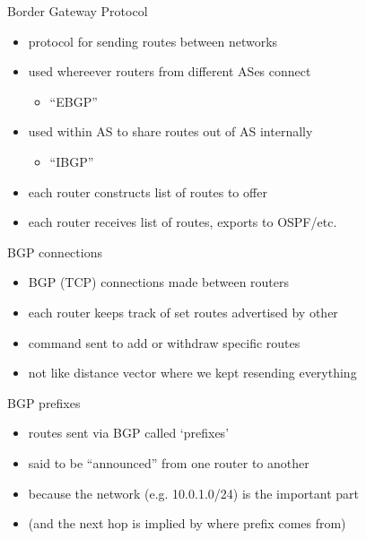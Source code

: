 \begin{frame}{Border Gateway Protocol}
    \begin{itemize}
    \item protocol for sending routes between networks
    \item used whereever routers from different ASes connect
        \begin{itemize}
        \item ``EBGP''
        \end{itemize}
    \item used within AS to share routes out of AS internally
        \begin{itemize}
        \item ``IBGP''
        \end{itemize}
    \vspace{.5cm}
    \item each router constructs list of routes to offer
    \item each router receives list of routes, exports to OSPF/etc.
    \end{itemize}
\end{frame}

\begin{frame}{BGP connections}
    \begin{itemize}
    \item BGP (TCP) connections made between routers
    \vspace{.5cm}
    \item each router keeps track of set routes advertised by other
    \item command sent to add or withdraw specific routes
    \vspace{.5cm}
    \item not like distance vector where we kept resending everything
    \end{itemize}
\end{frame}

\begin{frame}{BGP prefixes}
    \begin{itemize}
    \item routes sent via BGP called `prefixes'
    \item said to be ``announced'' from one router to another
    \vspace{.5cm}
    \item because the network (e.g. 10.0.1.0/24) is the important part
    \item (and the next hop is implied by where prefix comes from) 
    \end{itemize}
\end{frame}
